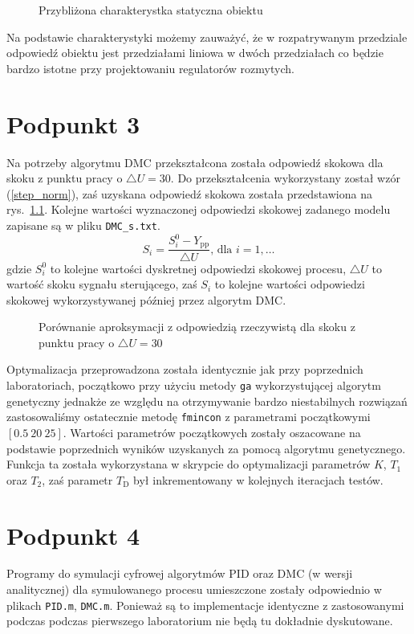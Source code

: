 \begin{figure}[H]
\centering

\caption{Przybliżona charakterystka statyczna obiektu}
\label{R5}
\end{figure}

Na podstawie charakterystyki możemy zauważyć, że w rozpatrywanym przedziale odpowiedź obiektu jest przedziałami liniowa w dwóch przedziałach co będzie bardzo istotne przy projektowaniu regulatorów rozmytych.

\chapter{Podpunkt 3}
Na potrzeby algorytmu DMC przekształcona została odpowiedź skokowa dla skoku z punktu pracy o $\triangle U = 30$. Do przekształcenia wykorzystany został wzór (\ref{step_norm}), zaś uzyskana odpowiedź skokowa została przedstawiona na rys.~\ref{R6}. Kolejne wartości wyznaczonej odpowiedzi skokowej zadanego modelu zapisane są w pliku \verb+DMC_s.txt+.
\begin{equation}
S_i = \frac{S_i^0 - Y_{\mathrm{pp}}}{\triangle U} \textrm{, dla } i=1,\ldots
\label{step_norm}
\end{equation}
gdzie $S_i^0$ to kolejne wartości dyskretnej odpowiedzi skokowej procesu, $\triangle U$ to wartość skoku sygnału sterującego, zaś $S_i$ to kolejne wartości odpowiedzi skokowej wykorzystywanej później przez algorytm DMC\@.

\begin{figure}[H]
\centering

\caption{Porównanie aproksymacji z odpowiedzią rzeczywistą dla skoku z punktu pracy o $\triangle U = 30$}
\label{R6}
\end{figure}

Optymalizacja przeprowadzona została identycznie jak przy poprzednich laboratoriach, początkowo przy użyciu metody \verb+ga+ wykorzystującej algorytm genetyczny jednakże ze względu na otrzymywanie bardzo niestabilnych rozwiązań zastosowaliśmy ostatecznie metodę \verb+fmincon+ z parametrami początkowymi $[\num{0,5} ~ 20 ~ 25]$. Wartości parametrów początkowych zostały oszacowane na podstawie poprzednich wyników uzyskanych za pomocą algorytmu genetycznego. Funkcja ta została wykorzystana w skrypcie do optymalizacji parametrów $K$, $T_1$ oraz $T_2$, zaś parametr $T_{\mathrm{D}}$ był inkrementowany w kolejnych iteracjach testów.

\chapter{Podpunkt 4}
Programy do symulacji cyfrowej algorytmów PID oraz DMC (w wersji analitycznej) dla symulowanego procesu umieszczone zostały odpowiednio w plikach \verb+PID.m+, \verb+DMC.m+. Ponieważ są to implementacje identyczne z zastosowanymi podczas podczas pierwszego laboratorium nie będą tu dokładnie dyskutowane.


